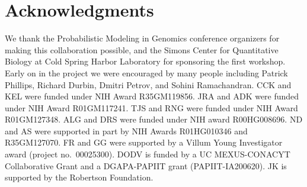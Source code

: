 \documentclass[12pt,halfline,a4paper]{ouparticle}
\begin{document}

\section*{Acknowledgments}
We thank the Probabilistic Modeling in Genomics conference organizers for making this collaboration possible,
and the Simons Center for Quantitative Biology at Cold Spring Harbor Laboratory
for sponsoring the first workshop.
Early on in the project we were encouraged by many people including Patrick Phillips, Richard Durbin,
Dmitri Petrov, and Sohini Ramachandran.
CCK and KEL were funded under NIH Award R35GM119856.
JRA and ADK were funded under NIH Award R01GM117241.
TJS and RNG were funded under NIH Award R01GM127348.
ALG and DRS were funded under NIH award R00HG008696.
ND and AS were supported in part by NIH Awards R01HG010346 and R35GM127070.
FR and GG were supported by a Villum Young Investigator award (project no.~00025300).
DODV is funded by a UC MEXUS-CONACYT Collaborative Grant and a DGAPA-PAPIIT grant (PAPIIT-IA200620).
JK is supported by the Robertson Foundation.
\end{document}
